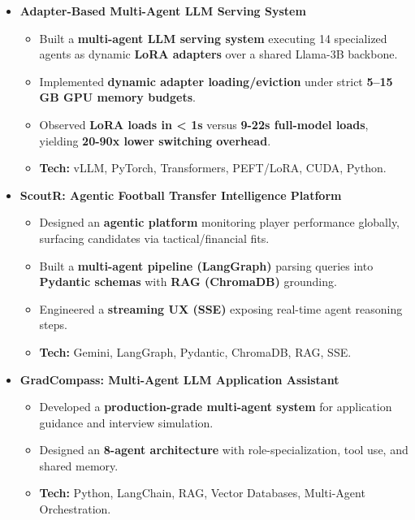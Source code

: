 \documentclass[a4paper,11pt]{article}
\begin{document}
\begin{itemize}
  \item \textbf{Adapter-Based Multi-Agent LLM Serving System}
    \begin{itemize}[nosep, after=\strut, leftmargin=1.2em, itemsep=2pt]
      \item Built a \textbf{multi-agent LLM serving system} executing 14 specialized agents as dynamic \textbf{LoRA adapters} over a shared Llama-3B backbone.
      \item Implemented \textbf{dynamic adapter loading/eviction} under strict \textbf{5--15\,GB GPU memory budgets}.
      \item Observed \textbf{LoRA loads in < 1s} versus \textbf{9-22s full-model loads}, yielding \textbf{20-90x lower switching overhead}.
      \item \textbf{Tech:} vLLM, PyTorch, Transformers, PEFT/LoRA, CUDA, Python.
    \end{itemize}

  \item \textbf{ScoutR: Agentic Football Transfer Intelligence Platform}
    \begin{itemize}[nosep, after=\strut, leftmargin=1.2em, itemsep=2pt]
      \item Designed an \textbf{agentic platform} monitoring player performance globally, surfacing candidates via tactical/financial fits.
      \item Built a \textbf{multi-agent pipeline (LangGraph)} parsing queries into \textbf{Pydantic schemas} with \textbf{RAG (ChromaDB)} grounding.
      \item Engineered a \textbf{streaming UX (SSE)} exposing real-time agent reasoning steps.
      \item \textbf{Tech:} Gemini, LangGraph, Pydantic, ChromaDB, RAG, SSE.
    \end{itemize}

  \item \textbf{GradCompass: Multi-Agent LLM Application Assistant}
    \begin{itemize}[nosep, after=\strut, leftmargin=1.2em, itemsep=2pt]
      \item Developed a \textbf{production-grade multi-agent system} for application guidance and interview simulation.
      \item Designed an \textbf{8-agent architecture} with role-specialization, tool use, and shared memory.
      \item \textbf{Tech:} Python, LangChain, RAG, Vector Databases, Multi-Agent Orchestration.
    \end{itemize}


\end{itemize}
\end{document}
